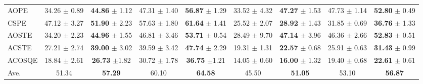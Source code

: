 \documentclass[11pt]{article}
\begin{document}
\begin{table*}[]
{\begin{tabular}{l|cccc|cccc}
AOPE                           & 34.26             \tiny{$\pm$  0.89}            & \multicolumn{1}{c|}{\textbf{44.86}       \tiny{$\pm$ 1.12}}       & 47.31          \tiny{$\pm$ 1.40}            & \textbf{56.87}       \tiny{$\pm$ 1.29}       & 33.52               \tiny{$\pm$ 4.32}        & \multicolumn{1}{c|}{\textbf{47.27}       \tiny{$\pm$ 1.53}}            & 47.73           \tiny{$\pm$ 1.14}            & \textbf{52.80}        \tiny{$\pm$ 0.49}          \\
CSPE                           & 47.12             \tiny{$\pm$  3.27}            & \multicolumn{1}{c|}{\textbf{51.90}       \tiny{$\pm$ 2.23} }     & 57.63           \tiny{$\pm$ 1.80}            & \textbf{61.64}     \tiny{$\pm$ 1.41}        & 25.52                \tiny{$\pm$  2.07}        & \multicolumn{1}{c|}{\textbf{28.92}      \tiny{$\pm$ 1.43}}           & 31.85           \tiny{$\pm$ 0.69}            & \textbf{36.76}        \tiny{$\pm$ 1.33}          \\ \midrule

AOSTE                          & 34.20             \tiny{$\pm$  2.23}            & \multicolumn{1}{c|}{\textbf{44.96} \tiny{$\pm$ 1.55}}                & 46.81         \tiny{$\pm$ 3.46}            & \textbf{53.71}       \tiny{$\pm$ 0.54}        & 28.49                \tiny{$\pm$  9.70}        & \multicolumn{1}{c|}{\textbf{47.14}       \tiny{$\pm$ 3.96}}      & 46.36          \tiny{$\pm$  2.66}            & \textbf{52.83}       \tiny{$\pm$ 0.51 }         \\
ACSTE                          & 27.21             \tiny{$\pm$  2.74}            & \multicolumn{1}{c|}{\textbf{39.00} \tiny{$\pm$ 3.02}}             & 39.59          \tiny{$\pm$ 3.42}            & \textbf{47.74}       \tiny{$\pm$ 2.29}          & 19.31               \tiny{$\pm$ 1.31}        & \multicolumn{1}{c|}{\textbf{22.57}        \tiny{$\pm$ 0.68}}          & 25.91           \tiny{$\pm$ 0.63}            & \textbf{31.43}       \tiny{$\pm$ 0.99}               \\ \midrule
ACOSQE                         & 18.84             \tiny{$\pm$ 2.61}           & \multicolumn{1}{c|}{\textbf{26.73}  \tiny{$\pm$1.82}}               & 30.72           \tiny{$\pm$ 1.78}            & \textbf{36.75}        \tiny{$\pm$1.21}               & 14.05                \tiny{$\pm$ 0.60 }       & \multicolumn{1}{c|}{\textbf{16.00}        \tiny{$\pm$ 1.32}}               & 19.40           \tiny{$\pm$  0.68}            & \textbf{22.61}      \tiny{$\pm$  0.61 }           \\ \midrule
Ave.                           & {51.34}           & \multicolumn{1}{c|}{\textbf{57.29}}          & {60.10}           & {\textbf{64.58}}           & {45.50}           & \multicolumn{1}{c|}{\textbf{51.05}}          & {53.10}           & {\textbf{56.87}}           \\ \bottomrule
\end{tabular}



}
\end{table*}
\end{document}
